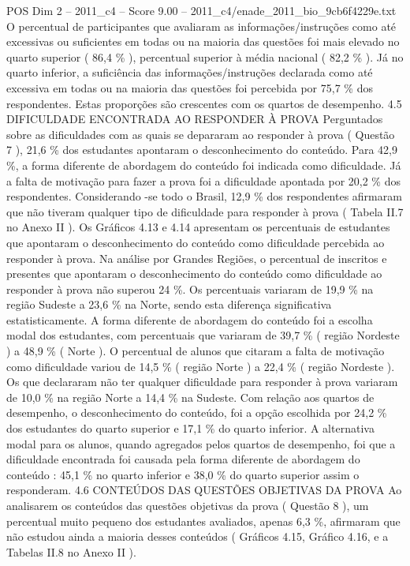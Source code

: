 \begin{textsample}{POS Dim 2 – 2011\_c4 – Score 9.00 – 2011\_c4/enade\_2011\_bio\_9cb6f4229e.txt}
O percentual de participantes que avaliaram as informações/instruções como até excessivas ou suficientes em todas ou na maioria das questões foi mais elevado no quarto superior ( 86,4 \% ), percentual superior à média nacional ( 82,2 \% ).
Já no quarto inferior, a suficiência das informações/instruções declarada como até excessiva em todas ou na maioria das questões foi percebida por 75,7 \% dos respondentes.
Estas proporções são crescentes com os quartos de desempenho. 4.5 DIFICULDADE ENCONTRADA AO RESPONDER À PROVA Perguntados sobre as dificuldades com as quais se depararam ao responder à prova ( Questão 7 ), 21,6 \% dos estudantes apontaram o desconhecimento do conteúdo.
Para 42,9 \%, a forma diferente de abordagem do conteúdo foi indicada como dificuldade.
Já a falta de motivação para fazer a prova foi a dificuldade apontada por 20,2 \% dos respondentes.
Considerando -se todo o Brasil, 12,9 \% dos respondentes afirmaram que não tiveram qualquer tipo de dificuldade para responder à prova ( Tabela II.7 no Anexo II ).
Os Gráficos 4.13 e 4.14 apresentam os percentuais de estudantes que apontaram o desconhecimento do conteúdo como dificuldade percebida ao responder à prova.
Na análise por Grandes Regiões, o percentual de inscritos e presentes que apontaram o desconhecimento do conteúdo como dificuldade ao responder à prova não superou 24 \%.
Os percentuais variaram de 19,9 \% na região Sudeste a 23,6 \% na Norte, sendo esta diferença significativa estatisticamente.
A forma diferente de abordagem do conteúdo foi a escolha modal dos estudantes, com percentuais que variaram de 39,7 \% ( região Nordeste ) a 48,9 \% ( Norte ).
O percentual de alunos que citaram a falta de motivação como dificuldade variou de 14,5 \% ( região Norte ) a 22,4 \% ( região Nordeste ).
Os que declararam não ter qualquer dificuldade para responder à prova variaram de 10,0 \% na região Norte a 14,4 \% na Sudeste.
Com relação aos quartos de desempenho, o desconhecimento do conteúdo, foi a opção escolhida por 24,2 \% dos estudantes do quarto superior e 17,1 \% do quarto inferior.
A alternativa modal para os alunos, quando agregados pelos quartos de desempenho, foi que a dificuldade encontrada foi causada pela forma diferente de abordagem do conteúdo : 45,1 \% no quarto inferior e 38,0 \% do quarto superior assim o responderam. 4.6 CONTEÚDOS DAS QUESTÕES OBJETIVAS DA PROVA Ao analisarem os conteúdos das questões objetivas da prova ( Questão 8 ), um percentual muito pequeno dos estudantes avaliados, apenas 6,3 \%, afirmaram que não estudou ainda a maioria desses conteúdos ( Gráficos 4.15, Gráfico 4.16, e a Tabelas II.8 no Anexo II ).

\end{textsample}
